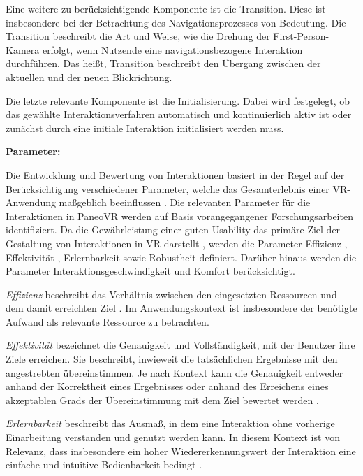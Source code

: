 Eine weitere zu berücksichtigende Komponente ist die Transition. Diese ist insbesondere bei der Betrachtung des Navigationsprozesses von Bedeutung. Die Transition beschreibt die Art und Weise, wie die Drehung der First-Person-Kamera erfolgt, wenn Nutzende eine navigationsbezogene Interaktion durchführen. Das heißt, Transition beschreibt den Übergang zwischen der aktuellen und der neuen Blickrichtung.

Die letzte relevante Komponente ist die Initialisierung. Dabei wird festgelegt, ob das gewählte Interaktionsverfahren automatisch und kontinuierlich aktiv ist oder zunächst durch eine initiale Interaktion initialisiert werden muss. 

{\normalfont \bfseries Parameter:} 

Die Entwicklung und Bewertung von Interaktionen basiert in der Regel auf der Berücksichtigung verschiedener Parameter, welche das Gesamterlebnis einer VR-Anwendung maßgeblich beeinflussen \citep{10.1145/3441852.3471230}. Die relevanten Parameter für die Interaktionen in PaneoVR werden auf Basis vorangegangener Forschungsarbeiten identifiziert. Da die Gewährleistung einer guten Usability das primäre Ziel der Gestaltung von Interaktionen in VR darstellt \citep{dorner_virtual_2019}, werden die Parameter Effizienz \citep{DINISO9241-11}, Effektivität \citep{DINISO9241-11}, Erlernbarkeit \citep{DINISO9241-110} sowie Robustheit \citep{DINISO9241-110} definiert. Darüber hinaus werden die Parameter Interaktionsgeschwindigkeit \citep{COOK2015117} und Komfort \citep{jerald_vr_2016} berücksichtigt. 

\textit{Effizienz} beschreibt das Verhältnis zwischen den eingesetzten Ressourcen und dem damit erreichten Ziel \citep{DINISO9241-11}. Im Anwendungskontext ist  insbesondere der benötigte Aufwand als relevante Ressource zu betrachten.

\textit{Effektivität} bezeichnet die Genauigkeit und Vollständigkeit, mit der Benutzer ihre Ziele erreichen. Sie beschreibt, inwieweit die tatsächlichen Ergebnisse mit den angestrebten übereinstimmen. Je nach Kontext kann die Genauigkeit entweder anhand der Korrektheit eines Ergebnisses oder anhand des Erreichens eines akzeptablen Grads der Übereinstimmung mit dem Ziel bewertet werden \citep{DINISO9241-11}.

\textit{Erlernbarkeit} beschreibt das Ausmaß, in dem eine Interaktion ohne vorherige Einarbeitung verstanden und genutzt werden kann. In diesem Kontext ist von Relevanz, dass insbesondere ein hoher Wiedererkennungswert der Interaktion eine einfache und intuitive Bedienbarkeit bedingt \citep{jerald_vr_2016}.

